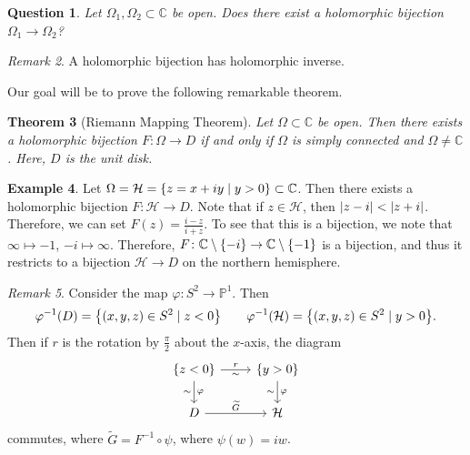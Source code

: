 \documentclass[leqno, openany]{memoir}
\newtheorem{thm}{Theorem}[section]
\newtheorem{quest}[thm]{Question}
\theoremstyle{definition}
\newtheorem{exm}[thm]{Example}
\theoremstyle{remark}
\newtheorem{rmk}[thm]{Remark}
\theoremstyle{plain}
\theoremstyle{definition}
\theoremstyle{remark}
\newcommand{\C}{\mathbb{C}}
\renewcommand{\P}{\mathbb{P}}
\newcommand{\mc}[1]{\mathcal{#1}}
\newcommand{\wt}[1]{\widetilde{#1}}
\begin{document}
\begin{quest} Let $\Omega_1, \Omega_2 \subset \C$ be open. Does there exist a
holomorphic bijection $\Omega_1 \to \Omega_2$?  \end{quest}

\begin{rmk} A holomorphic bijection has holomorphic inverse.  \end{rmk}

Our goal will be to prove the following remarkable theorem.
\begin{thm}[Riemann Mapping Theorem]\label{thm:rmt} Let $\Omega \subset \C$ be
    open. Then there exists a holomorphic bijection $F \colon \Omega \to D$ if
    and only if $\Omega$ is simply connected and $\Omega \neq \C$. Here, $D$ is
    the unit disk.  \end{thm}

\begin{exm} Let $\Omega = \mc{H} = \qty{z = x + iy \mid y > 0} \subset \C$.
    Then there exists a holomorphic bijection $F \colon \mc{H} \to D$. Note
    that if $z \in \mc{H}$, then $\abs{z-i} < \abs{z + i}$. Therefore, we can
    set $F(z) = \frac{i-z}{i+z}$. To see that this is a bijection, we note that
    $\infty \mapsto -1$, $-i \mapsto \infty$. Therefore, $F \colon \C \setminus
    \qty{-i} \to \C \setminus \qty{-1}$ is a bijection, and thus it restricts
    to a bijection $\mc{H} \to D$ on the northern hemisphere.  \end{exm}

\begin{rmk} Consider the map $\varphi \colon S^2 \to \P^1$. Then \[
\varphi^{-1}(D) = \qty{(x,y,z) \in S^2 \mid z < 0} \qquad \varphi^{-1} (\mc{H})
= \qty{(x,y,z) \in S^2 \mid y > 0}. \] Then if $r$ is the rotation by
$\frac{\pi}{2}$ about the $x$-axis, the diagram \begin{equation*}
    \begin{tikzcd} \qty{z < 0} \ar{r}{r}[swap]{\sim}
    \ar{d}{\varphi}[swap]{\sim} & \qty{y > 0} \ar{d}{\varphi}[swap]{\sim} \\ D
\ar{r}{\wt{G}} & \mc{H} \end{tikzcd} \end{equation*} commutes, where $\wt{G} =
F^{-1} \circ \psi$, where $\psi(w) = iw$.  \end{rmk}
\end{document}
